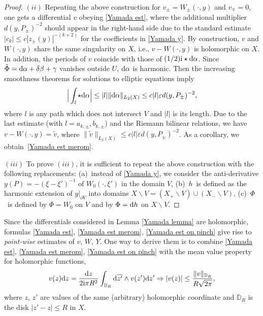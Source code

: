 \documentclass[pdftex]{sigma}
\numberwithin{equation}{section}
\theoremstyle{definition}
\begin{document}
\begin{proof}
$(ii)$ Repeating the above construction for $v_\pm=W_\pm(\cdot,y)$ and $v_\mp=0$, one gets a differential $v$ obeying \eqref{Yamada est}, where the additional multiplier $ d(y,P_\pm)^{-2}$ should appear in the right-hand side due to the standard estimate $|c_k|\le c|z_\pm(y)|^{-(k+2)}$ for the coefficients in \eqref{Yamada y}. By construction, $v$ and $W(\cdot,y)$ share the same singularity on $X$, i.e., $v-W(\cdot,y)$ is holomorphic on $X$. In addition, the periods of $v$ coincide with those of $(1/2){\rm i}\star {\rm d}\alpha$. Since $\tilde{\Phi}={\rm d}\alpha+\delta\beta+\gamma$ vanishes outside $U$, ${\rm d}\alpha$ is harmonic. Then the increasing smoothness theorems for solutions to elliptic equations imply
\[\Big|\int_l\star {\rm d}\alpha\Big|\le |l|\|{\rm d}\alpha\|_{L_2(X)}\le c|l|\varepsilon d(y,P_\pm)^{-2},\]
where $l$ is any path which does not intersect $V$ and $|l|$ is its length. Due to the last estimate (with $l=a_{k,\pm},b_{k,\pm}$) and the Riemann bilinear relations, we have $v-W(\cdot,y)=\tilde{v}$, where $\|\tilde{v}\|_{L_2(X)}\le c|l|\varepsilon d(y,P_\pm)^{-2}$. As a corollary, we obtain~\eqref{Yamada est merom}.

$(iii)$ To prove $(iii)$, it is sufficient to repeat the above construction with the following replacements: (a)~instead of \eqref{Yamada y}, we consider the anti-derivative $y(P)=-(\xi-\xi')^{-1}$ of $W_0(\cdot,\xi')$ in the domain $V$, (b)~$h$~is defined as the harmonic extension of $y|_{\partial V}$ into domains $X\backslash V=(X_+\backslash V)\cup (X_-\backslash V)$, (c)~$\Phi$~is defined by $\Phi=W_0$ on $V$ and by $\Phi={\rm d}h$ on $X\backslash V$.
\end{proof}

Since the differentials considered in Lemma \ref{Yamada lemma} are holomorphic, formulas \eqref{Yamada est}, \eqref{Yamada est merom}, \eqref{Yamada est on pinch} give rise to {\it point-wise} estimates of $v$, $W$, $Y$. One way to derive them is to combine \eqref{Yamada est}, \eqref{Yamada est merom}, \eqref{Yamada est on pinch} with the mean value property for holomorphic functions,
\begin{equation}
\label{mean value property}
v(z){\rm d}z=\frac{{\rm d}z}{2{\rm i}\pi R^2}\int_{\mathbb{D}_R}{\rm d}\overline{z'}\wedge v(z'){\rm d}z' \Rightarrow |v(z)|\le \frac{\|v\|_{\mathbb{D}_R}}{R\sqrt{2\pi}},
\end{equation}
where $z$, $z'$ are values of the same (arbitrary) holomorphic coordinate and $\mathbb{D}_R$ is the disk ${|z'-z|\le R}$ in $X$.
\end{document}
